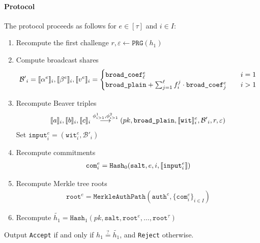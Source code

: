 \documentclass[11pt]{report}
\theoremstyle{definition}
\theoremstyle{plain}
\begin{document}
\begin{protocol}
  \paragraph{Protocol} The protocol proceeds as follows for $e \in [\tau]$ and $i \in I$:
  \begin{enumerate}[itemsep=0pt, topsep=0pt, parsep=0pt]
    \item Recompute the first challenge $r, \varepsilon \leftarrow \texttt{PRG}(h_1)$
    \item Compute broadcast shares
          \begin{align*}
            \mathcal{B'}_i = \llbracket \alpha^e \rrbracket_i, \llbracket \beta^e \rrbracket_i, \llbracket v^e \rrbracket_i =
            \begin{cases}
              \texttt{broad\_coef}^e_\ell                                                  & \quad i = 1 \\
              \texttt{broad\_plain} + \sum_{j=1}^\ell f_i^j \cdot \texttt{broad\_coef}_j^e & \quad i > 1
            \end{cases}
          \end{align*}
    \item Recompute Beaver triples
          \begin{align*}
            \llbracket a \rrbracket_i, \llbracket b \rrbracket_i, \llbracket c \rrbracket_i \stackrel{\phi^1_{i > 1}, \phi^2_{i > 1}}{\longrightarrow} (pk, \texttt{broad\_plain}, \llbracket \texttt{wit} \rrbracket_i^e, \mathcal{B'}_i, r, \varepsilon)
          \end{align*}
          Set $\texttt{input}^e_i = (\texttt{wit}_i^e, \mathcal{B'}_i)$
    \item Recompute commitments
          \begin{align*}
            \texttt{com}^e_i = \texttt{Hash}_0(\texttt{salt}, e, i, \llbracket \texttt{input}^e_i \rrbracket)
          \end{align*}
    \item Recompute Merkle tree roots
          \begin{align*}
            \texttt{root}^e = \texttt{MerkleAuthPath}(\texttt{auth}^e,\{\texttt{com}^e_i\}_{i \in I})
          \end{align*}
    \item Recompute $\tilde{h_1} = \texttt{Hash}_1(pk, \texttt{salt}, \texttt{root}^e, \ldots, \texttt{root}^{\tau})$
  \end{enumerate}

  Output \texttt{Accept} if and only if $h_1 \stackrel{?}{=} \tilde{h_1}$, and \texttt{Reject} otherwise.

\end{protocol}
\end{document}

